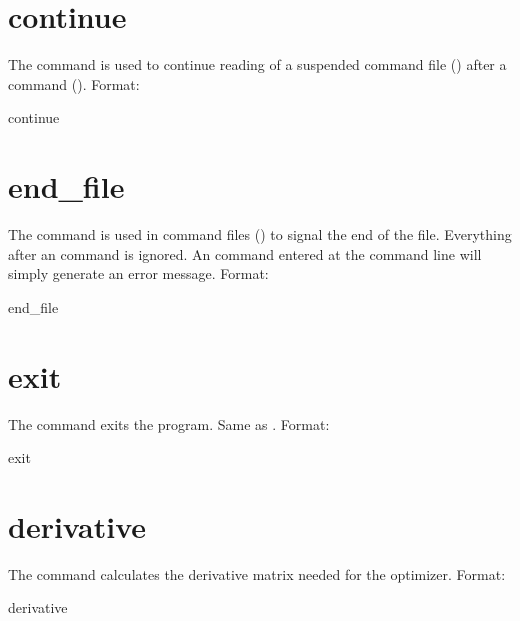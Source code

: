 \section{continue}
\label{s:continue}

The  command is used to continue reading of a suspended
command file () after a  command
(). Format:
\begin{example}
  continue
\end{example}

\section{end_file} \label{s:end.file}

The  command is used in command files
() to signal the end of the file. Everything
after an  command is ignored. An  command
entered at the command line will simply generate an error message.
Format:
\begin{example}
  end_file
\end{example}

\section{exit}
\label{s:exit}

The  command exits the program. Same as .  Format:
\begin{example}
  exit
\end{example}

\section{derivative}
\label{s:deriv}

The  command calculates the  derivative
matrix needed for the  optimizer.
Format:
\begin{example}
  derivative
\end{example}

